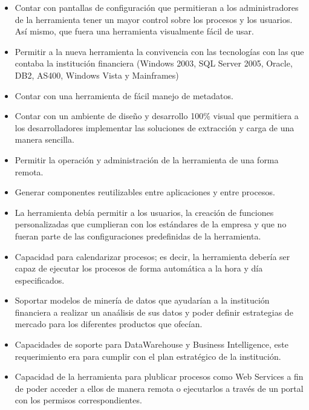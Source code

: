 \documentclass[a4paper,openright,12pt]{book}
\begin{document}
\begin{itemize}
\item Contar con pantallas de configuración que permitieran a los
  administradores de la herramienta tener un mayor control sobre los procesos y
  los usuarios. Así mismo, que fuera una herramienta visualmente fácil de usar.

\item Permitir a la nueva herramienta la convivencia con las tecnologías con las
  que contaba la institución financiera (Windows 2003, SQL Server 2005, Oracle,
  DB2, AS400, Windows Vista y Mainframes)

\item Contar con una herramienta de fácil manejo de metadatos.

\item Contar con un ambiente de diseño y desarrollo 100\% visual que permitiera
  a los desarrolladores implementar las soluciones de extracción y carga de una
  manera sencilla.

\item Permitir la operación y administración de la herramienta de una forma
  remota.

\item Generar componentes reutilizables entre aplicaciones y entre procesos.

\item La herramienta debía permitir a los usuarios, la creación de funciones
  personalizadas que cumplieran con los estándares de la empresa y que no fueran
  parte de las configuraciones predefinidas de la herramienta.

\item Capacidad para calendarizar procesos; es decir, la herramienta debería ser
  capaz de ejecutar los procesos de forma automática a la hora y día
  especificados.

\item Soportar modelos de minería de datos que ayudarían a la institución
  financiera a realizar un anaálisis de sus datos y poder definir estrategias de
  mercado para los diferentes productos que ofecían.

\item Capacidades de soporte para DataWarehouse y Business Intelligence, este
  requerimiento era para cumplir con el plan estratégico de la institución.

\item Capacidad de la herramienta para plublicar procesos como Web Services a
  fin de poder acceder a ellos de manera remota o ejecutarlos a través de un
  portal con los permisos correspondientes.


\end{itemize}
\end{document}
